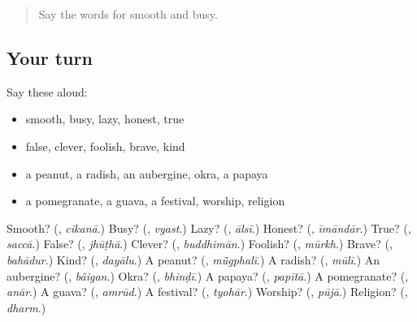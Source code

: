 \begin{quote}
Say the words for smooth and busy.
\end{quote}

\subsection*{Your turn}
Say these aloud:

\begin{itemize}
\raggedright
  \item smooth, busy, lazy, honest, true
  \item false, clever, foolish, brave, kind
  \item a peanut, a radish, an aubergine, okra, a papaya
  \item a pomegranate, a guava, a festival, worship, religion
\end{itemize}

\begin{tcolorbox}[breakable,colback=teal!4,colframe=teal!35!black,title={Before you move on}]
Smooth? (\textbf{}, \emph{cikanā}.) Busy? (\textbf{}, \emph{vyast}.) Lazy? (\textbf{}, \emph{ālsī}.) Honest? (\textbf{}, \emph{īmāndār}.) True? (\textbf{}, \emph{saccā}.) False? (\textbf{}, \emph{jhūṭhā}.) Clever? (\textbf{}, \emph{buddhimān}.) Foolish? (\textbf{}, \emph{mūrkh}.) Brave? (\textbf{}, \emph{bahādur}.) Kind? (\textbf{}, \emph{dayālu}.) A peanut? (\textbf{}, \emph{mū̃gphalī}.) A radish? (\textbf{}, \emph{mūlī}.) An aubergine? (\textbf{}, \emph{bãigan}.) Okra? (\textbf{}, \emph{bhinḍī}.) A papaya? (\textbf{}, \emph{papītā}.) A pomegranate? (\textbf{}, \emph{anār}.) A guava? (\textbf{}, \emph{amrūd}.) A festival? (\textbf{}, \emph{tyohār}.) Worship? (\textbf{}, \emph{pūjā}.) Religion? (\textbf{}, \emph{dharm}.)
\end{tcolorbox}
